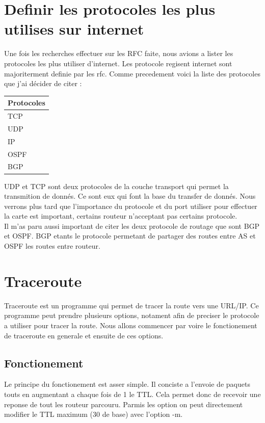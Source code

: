 \documentclass[5pt]{article}
\begin{document}
    \section{Definir les protocoles les plus utilises sur internet}
    Une fois les recherches effectuer sur les RFC faite, nous avions a lister les protocoles les plus utiliser d'internet. Les protocole regisent internet sont majoriterment definie par les rfc. Comme precedement voici la liste des protocoles que j'ai décider de citer :
     \begin{center}
        \begin{tabular}{|l|}
            \hline
            Protocoles \\
            \hline
            TCP \\
            \hline
            UDP \\
            \hline
             IP \\
            \hline
            OSPF \\
            \hline
            BGP \\
            \hline
        \end{tabular}
     \end{center}
    

    UDP et TCP sont deux protocoles de la couche transport qui permet la transmition de donnés. Ce sont eux qui font la base du transfer de donnés. Nous verrons plus tard que l'importance du protocole et du port utiliser pour effectuer la carte est important, certains routeur n'acceptant pas certains protocole. \\
         Il m'as paru aussi important de citer les deux protocole de routage que sont BGP et OSPF. BGP etants le protocole permetant de partager des routes entre AS et OSPF les routes entre routeur.  
    
    \section{Traceroute}
    Traceroute est un programme qui permet de tracer la route vers une URL/IP. Ce programme peut prendre plusieurs options, notament afin de preciser le protocole a utiliser pour tracer la route. Nous allons commencer par voire le fonctionement de traceroute en generale et ensuite de ces options.

         \subsection{Fonctionement}
         Le principe du fonctionement est asser simple. Il conciste a l'envoie de paquets touts en augmentant a chaque fois de 1 le TTL. Cela permet donc de recevoir une reponse de tout les routeur parcouru. Parmis les option on peut directement modifier le TTL maximum (30 de base) avec l'option -m.
      
\end{document}
